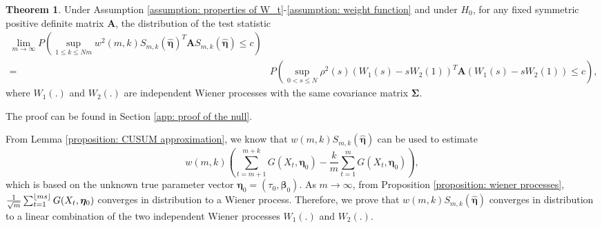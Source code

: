 \documentclass{article}
\DeclarePairedDelimiter\floor{\lfloor}{\rfloor}
\theoremstyle{definition}
\newtheorem{theorem}{Theorem}[section]
\begin{document}
\begin{theorem}
\label{theorem: null}
Under Assumption \ref{assumption: properties of W_t}-\ref{assumption: weight function} and under $H_0$, for any fixed symmetric positive definite matrix $\bm{A}$, the distribution of the test statistic 
\begin{equation*}
\begin{aligned}
    \underset{m \rightarrow \infty}{\lim} P\left(\underset{1\leq k \leq Nm}{\sup} w^2(m,k)S_{m,k}(\hat{\bm{\eta}})^T\bm{A}S_{m,k}(\hat{\bm{\eta}}) \leq c    \right) \\
     = &P \left( \underset{0<s\leq N}{\sup} \rho^2(s)(W_1(s)-sW_2(1))^T\bm{A}(W_1(s)-sW_2(1))\leq c \right),
\end{aligned}
\end{equation*}
where $W_1(.)$ and $W_2(.)$ are independent Wiener processes with the same covariance matrix $\bm{\Sigma}$.
\end{theorem}
The proof can be found in Section \ref{app: proof of the null}.

From Lemma \ref{proposition: CUSUM approximation}, we know that $w(m,k)S_{m,k}(\hat{\bm{\eta}})$ can be used to estimate $$w(m,k)(\sum_{t=m+1}^{m+k}G(X_t,\bm{\eta}_0)-\frac{k}{m}\sum_{t=1}^m G(X_t,\bm{\eta}_0)),$$ which is based on the unknown true parameter vector $\bm{\eta}_0 = (\tau_0,\bm{\beta}_0)$. As $m \rightarrow \infty$, from Proposition \ref{proposition: wiener processes}, $\frac{1}{\sqrt{m}}\sum_{t=1}^{\floor{ms}}G(X_t,\bm{\eta}_0)$ converges in distribution to a Wiener process. Therefore, we prove that $w(m,k)S_{m,k}(\hat{\bm{\eta}})$ converges in distribution to a linear combination of the two independent Wiener processes $W_1(.)$ and $W_2(.)$.
\end{document}
